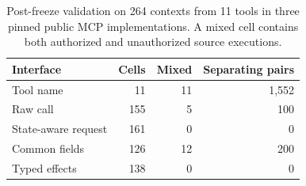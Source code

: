 \begin{table}[t]
\centering
\scriptsize
\setlength{\tabcolsep}{4pt}
\caption{Post-freeze validation on 264 contexts from 11 tools in three pinned
public MCP implementations. A mixed cell contains both authorized and
unauthorized source executions.}
\label{tab:third-party-validation}
\begin{tabular}{lrrr}
\toprule
Interface & Cells & Mixed & Separating pairs \\
\midrule
Tool name & 11 & 11 & 1,552 \\
Raw call & 155 & 5 & 100 \\
State-aware request & 161 & 0 & 0 \\
Common fields & 126 & 12 & 200 \\
Typed effects & 138 & 0 & 0 \\
\bottomrule
\end{tabular}
\end{table}
